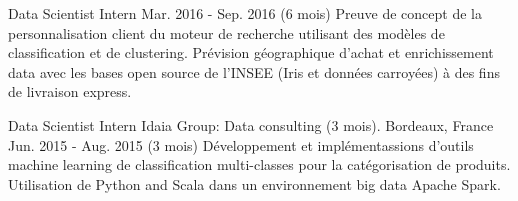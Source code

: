 \begin{cventries}
  \cventry
    {Data Scientist Intern} %
    {} %
    {} %
    {Mar. 2016 - Sep. 2016 (6 mois)} %
    {
    Preuve de concept de la personnalisation client du moteur de recherche utilisant des modèles de classification et de clustering.\newline 
    Prévision géographique d'achat et enrichissement data avec les bases open source de l'INSEE (Iris et données carroyées) à des fins de livraison express.
    }

  \cventry
    {Data Scientist Intern} %
    {Idaia Group: Data consulting (3 mois).} %
    {Bordeaux, France} %
    {Jun. 2015 - Aug. 2015 (3 mois)} %
    {
    Développement et implémentassions d'outils machine learning de classification multi-classes pour la catégorisation de produits.\newline
    Utilisation de Python and Scala dans un environnement big data Apache Spark.
    }
    
\end{cventries}

